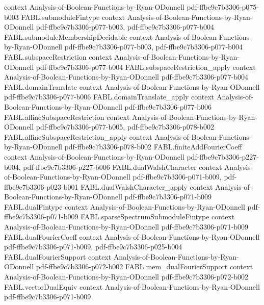 \begin{theorem}
  {context}
  {Analysis-of-Boolean-Functions-by-Ryan-ODonnell}
  {pdf-ffbe9c7b3306-p075-b003}
\proofstep
  {FABL.submoduleFintype}
  {context}
  {Analysis-of-Boolean-Functions-by-Ryan-ODonnell}
  {pdf-ffbe9c7b3306-p077-b003,
    pdf-ffbe9c7b3306-p077-b004}
\proofstep
  {FABL.submoduleMembershipDecidable}
  {context}
  {Analysis-of-Boolean-Functions-by-Ryan-ODonnell}
  {pdf-ffbe9c7b3306-p077-b003,
    pdf-ffbe9c7b3306-p077-b004}
\proofstep
  {FABL.subspaceRestriction}
  {context}
  {Analysis-of-Boolean-Functions-by-Ryan-ODonnell}
  {pdf-ffbe9c7b3306-p077-b004}
\proofstep
  {FABL.subspaceRestriction_apply}
  {context}
  {Analysis-of-Boolean-Functions-by-Ryan-ODonnell}
  {pdf-ffbe9c7b3306-p077-b004}
\proofstep
  {FABL.domainTranslate}
  {context}
  {Analysis-of-Boolean-Functions-by-Ryan-ODonnell}
  {pdf-ffbe9c7b3306-p077-b006}
\proofstep
  {FABL.domainTranslate_apply}
  {context}
  {Analysis-of-Boolean-Functions-by-Ryan-ODonnell}
  {pdf-ffbe9c7b3306-p077-b006}
\proofstep
  {FABL.affineSubspaceRestriction}
  {context}
  {Analysis-of-Boolean-Functions-by-Ryan-ODonnell}
  {pdf-ffbe9c7b3306-p077-b005,
    pdf-ffbe9c7b3306-p078-b002}
\proofstep
  {FABL.affineSubspaceRestriction_apply}
  {context}
  {Analysis-of-Boolean-Functions-by-Ryan-ODonnell}
  {pdf-ffbe9c7b3306-p078-b002}
\proofstep
  {FABL.finiteAddFourierCoeff}
  {context}
  {Analysis-of-Boolean-Functions-by-Ryan-ODonnell}
  {pdf-ffbe9c7b3306-p227-b004,
    pdf-ffbe9c7b3306-p227-b006}
\proofstep
  {FABL.dualWalshCharacter}
  {context}
  {Analysis-of-Boolean-Functions-by-Ryan-ODonnell}
  {pdf-ffbe9c7b3306-p071-b009,
    pdf-ffbe9c7b3306-p023-b001}
\proofstep
  {FABL.dualWalshCharacter_apply}
  {context}
  {Analysis-of-Boolean-Functions-by-Ryan-ODonnell}
  {pdf-ffbe9c7b3306-p071-b009}
\proofstep
  {FABL.dualFintype}
  {context}
  {Analysis-of-Boolean-Functions-by-Ryan-ODonnell}
  {pdf-ffbe9c7b3306-p071-b009}
\proofstep
  {FABL.sparseSpectrumSubmoduleFintype}
  {context}
  {Analysis-of-Boolean-Functions-by-Ryan-ODonnell}
  {pdf-ffbe9c7b3306-p071-b009}
\proofstep
  {FABL.dualFourierCoeff}
  {context}
  {Analysis-of-Boolean-Functions-by-Ryan-ODonnell}
  {pdf-ffbe9c7b3306-p071-b009,
    pdf-ffbe9c7b3306-p025-b004}
\proofstep
  {FABL.dualFourierSupport}
  {context}
  {Analysis-of-Boolean-Functions-by-Ryan-ODonnell}
  {pdf-ffbe9c7b3306-p072-b002}
\proofstep
  {FABL.mem_dualFourierSupport}
  {context}
  {Analysis-of-Boolean-Functions-by-Ryan-ODonnell}
  {pdf-ffbe9c7b3306-p072-b002}
\proofstep
  {FABL.vectorDualEquiv}
  {context}
  {Analysis-of-Boolean-Functions-by-Ryan-ODonnell}
  {pdf-ffbe9c7b3306-p071-b009}
\proofstep

\end{theorem}
